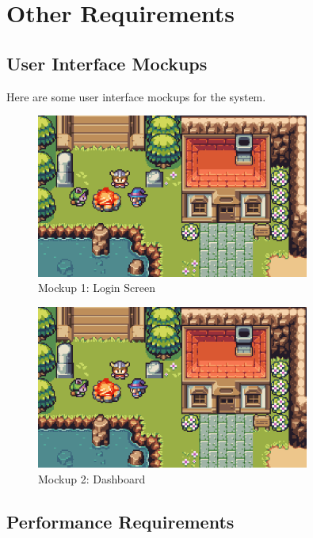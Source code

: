 
\section{Other Requirements}

\subsection{User Interface Mockups}

Here are some user interface mockups for the system.

\begin{figure}[htbp]
    \centering
    \includegraphics[width=0.8\textwidth]{images/mockup}
    \caption{Mockup 1: Login Screen}
    \label{fig:mockup1}
\end{figure}

\begin{figure}[htbp]
    \centering
    \includegraphics[width=0.8\textwidth]{images/mockup}
    \caption{Mockup 2: Dashboard}
    \label{fig:mockup2}
\end{figure}

\subsection{Performance Requirements}

